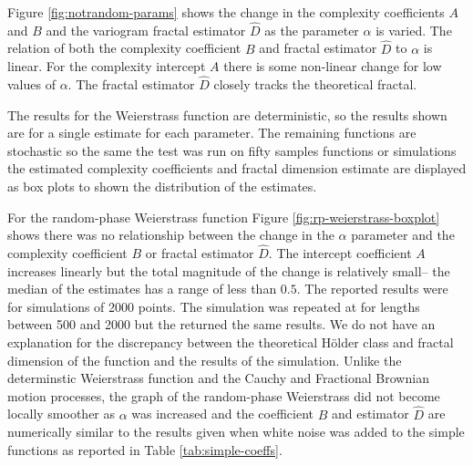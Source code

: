 Figure \ref{fig:notrandom-params} shows the change
in the complexity coefficients $A$ and $B$ and the
variogram fractal estimator $\hat D$ as the parameter 
$\alpha$ is varied. The relation of both the 
complexity coefficient $B$ and fractal estimator $\hat D$ to 
$\alpha$ is linear. For the complexity intercept 
$A$ there is some non-linear change for low values of $\alpha$. The fractal estimator 
$\hat D$ closely tracks the theoretical fractal. 


The results for the Weierstrass function are deterministic, 
so the results shown are for a single estimate for 
each parameter.
The remaining functions are stochastic so the same 
the test was run on fifty samples functions or simulations the
estimated complexity coefficients and fractal dimension 
estimate are displayed as box plots to shown the distribution
of the estimates.

For the random-phase Weierstrass function Figure 
\ref{fig:rp-weierstrass-boxplot} shows there 
was no relationship between the change in the $\alpha$ 
parameter and the complexity coefficient $B$ or 
fractal estimator $\hat D$. The intercept coefficient $A$ increases 
linearly but the total magnitude of the change is 
relatively small-- the median of the estimates has a range 
of less than $0.5$. The 
reported results were for simulations of 2000 
points. The simulation was repeated at for lengths between 
500 and 2000 but the returned the same results. We 
do not have an explanation for the discrepancy between 
the theoretical H\"older class and fractal dimension 
of the function and the results of the simulation. Unlike the determinstic Weierstrass 
function and the Cauchy and Fractional Brownian 
motion processes, the graph of the random-phase 
Weierstrass did not become locally smoother as 
$\alpha$ was increased and the coefficient $B$ and 
estimator $\hat D$ are numerically similar to the results 
given when white noise was added to the simple functions 
as reported in Table \ref{tab:simple-coeffs}.

